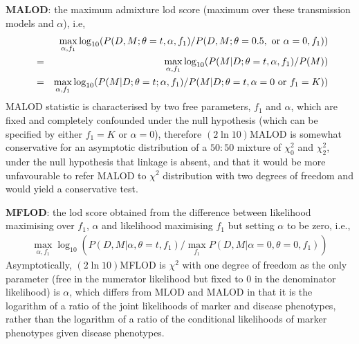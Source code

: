 {\bf MALOD}:  the maximum admixture lod score (maximum over these transmission
models and $\alpha$), i.e,
\begin{eqnarray*}
~&~&\max\limits_{\alpha,f_1} \log_{10}(P(D,M;\theta=t,\alpha,f_1)/P(D,M;\theta=0.5,
~\mbox{or}~ \alpha=0,f_1))\cr
&=&\max\limits_{\alpha,f_1} \log_{10}(P(M|D;\theta=t,\alpha,f_1)/P(M))\cr
&=&\max\limits_{\alpha,f_1} \log_{10}(P(M|D;\theta=t; \alpha, f_1)/P(M|D;
\theta = t, \alpha=0 ~\mbox{or}~f_1=K))
\end{eqnarray*}
MALOD statistic is characterised by two free parameters, $f_1$ and $\alpha$,
which are fixed and completely confounded under the null hypothesis (which can
be specified by either $f_1=K$ or $\alpha=0$), therefore $(2\ln 10)$MALOD is
somewhat conservative for an asymptotic distribution of a $50:50$ mixture of
$\chi_0^2$ and $\chi_2^2$, under the null hypothesis that linkage is absent,
and that it would be more unfavourable to refer MALOD to $\chi^2$ distribution
with two degrees of freedom and would yield a conservative test.

{\bf MFLOD}:  the lod score obtained from the difference between likelihood
maximising over $f_1$, $\alpha$ and likelihood maximising $f_1$ but setting
$\alpha$ to be zero, i.e.,
\begin{eqnarray*}
\max\limits_{\alpha,f_1}
\log_{10}(P(D,M|\alpha,\theta=t,f_1)/\max\limits_{f_1}P(D,M|\alpha=0,\theta=0,f_1))
\end{eqnarray*}
Asymptotically, $(2\ln10)$MFLOD is $\chi^2$ with one degree of freedom as the
only parameter (free in the numerator likelihood but fixed to 0 in the
denominator likelihood) is $\alpha$, which differs from MLOD and MALOD in that
it is the logarithm of a ratio of the joint likelihoods of marker and disease
phenotypes, rather than the logarithm of a ratio of the conditional likelihoods
of marker phenotypes given disease phenotypes.


